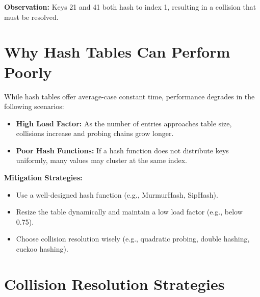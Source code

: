 \documentclass{article}
\begin{document}
\begin{center}
\end{center}

\textbf{Observation:} Keys 21 and 41 both hash to index 1, resulting in a collision that must be resolved.

\section{Why Hash Tables Can Perform Poorly}

While hash tables offer average-case constant time, performance degrades in the following scenarios:

\begin{itemize}
  \item \textbf{High Load Factor:} As the number of entries approaches table size, collisions increase and probing chains grow longer.
  \item \textbf{Poor Hash Functions:} If a hash function does not distribute keys uniformly, many values may cluster at the same index.
\end{itemize}

\textbf{Mitigation Strategies:}
\begin{itemize}
  \item Use a well-designed hash function (e.g., MurmurHash, SipHash).
  \item Resize the table dynamically and maintain a low load factor (e.g., below 0.75).
  \item Choose collision resolution wisely (e.g., quadratic probing, double hashing, cuckoo hashing).
\end{itemize}

\section{Collision Resolution Strategies}
\end{document}
